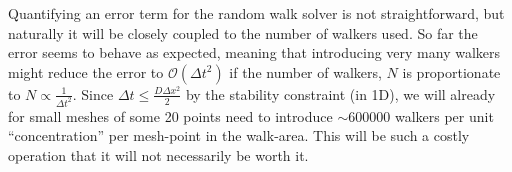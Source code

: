 Quantifying an error term for the random walk solver is not straightforward, but naturally it will be closely coupled to the number of walkers used. 
So far the error seems to behave as expected, meaning that introducing very many walkers might reduce the error to $\mathcal{O}(\Delta t^2)$ if the number of walkers, $N$ is proportionate to $N\propto\frac{1}{\Delta t^2}$. 
Since $\Delta t \leq\frac{D\Delta x^2}{2}$ by the stability constraint (in 1D), we will already for small meshes of some 20 points need to introduce $\sim600000$ walkers per unit ``concentration'' per mesh-point in the walk-area. 
This will be such a costly operation that it will not necessarily be worth it.\\
% 

